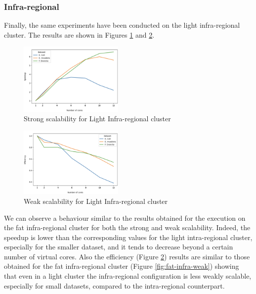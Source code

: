 \documentclass[final,5p,times,twocolumn,authoryear]{elsarticle}
\begin{document}
\subsubsection{Infra-regional}
Finally, the same experiments have been conducted on the light infra-regional cluster. The results are shown in Figures \ref{fig:light-infra-strong} and \ref{fig:light-infra-weak}. 
\begin{figure}[H]
   \centering
   \includegraphics[width=0.45\textwidth]{images/light_infra_strong.png}
   \caption{Strong scalability for Light Infra-regional cluster }
   \label{fig:light-infra-strong}
\end{figure}
\begin{figure}[H]
   \centering
   \includegraphics[width=0.45\textwidth]{images/light_infra_weak.png}
   \caption{Weak scalability for Light Infra-regional cluster }
   \label{fig:light-infra-weak}
\end{figure}
We can observe a behaviour similar to the results obtained for the execution on the fat infra-regional cluster for both the strong and weak scalability. Indeed, the speedup is lower than the corresponding values for the light intra-regional cluster, especially for the smaller dataset, and it tends to decrease beyond a certain number of virtual cores. Also the efficiency (Figure \ref{fig:light-infra-weak}) results are similar to those obtained for the fat infra-regional cluster (Figure \ref{fig:fat-infra-weak}) showing that even in a light cluster the infra-regional configuration is less weakly scalable, especially for small datasets, compared to the intra-regional counterpart. 
\end{document}
